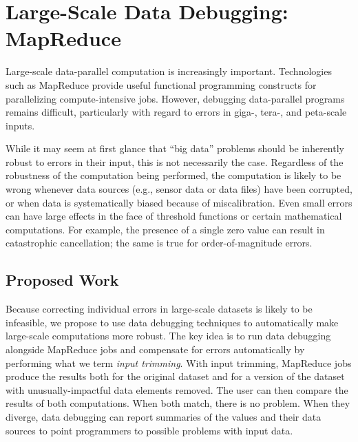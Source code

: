 \section{Large-Scale Data Debugging: MapReduce}

Large-scale data-parallel computation is increasingly important.
Technologies such as MapReduce provide useful functional programming
constructs for parallelizing compute-intensive jobs.  However,
debugging data-parallel programs remains difficult, particularly with
regard to errors in giga-, tera-, and peta-scale inputs. 

While it may seem at first glance that ``big data'' problems should be
inherently robust to errors in their input, this is not necessarily
the case. Regardless of the robustness of the computation being
performed, the computation is likely to be wrong whenever data sources
(e.g., sensor data or data files) have been corrupted, or when data is
systematically biased because of miscalibration. Even small errors can
have large effects in the face of threshold functions or certain
mathematical computations. For example, the presence of a single zero
value can result in catastrophic cancellation; the same is true for
order-of-magnitude errors.

\subsection{Proposed Work}

Because correcting individual errors in large-scale datasets is likely
to be infeasible, we propose to use data debugging techniques to
automatically make large-scale computations more robust. The key idea
is to run data debugging alongside MapReduce jobs and compensate for
errors automatically by performing what we term \emph{input
  trimming}. With input trimming, MapReduce jobs produce the results
both for the original dataset and for a version of the dataset with
unusually-impactful data elements removed. The user can then compare
the results of both computations. When both match, there is no
problem. When they diverge, data debugging can report summaries of the
values and their data sources to point programmers to possible
problems with input data.


